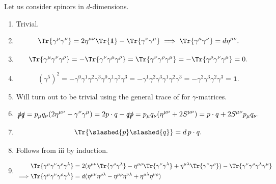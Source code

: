 \begin{solution}
Let us consider spinors in $d$-dimensions.
    \begin{enumerate}[label=\roman*.]
    \item Trivial.
    \item 
    \begin{equation}
            \Tr{\gamma^\mu\gamma^\nu} = 2\eta^{\mu\nu}\Tr{\mathbf{1}} -\Tr{\gamma^\nu\gamma^\mu}\implies\Tr{\gamma^\mu\gamma^\nu} = d\eta^{\mu\nu}.
        \end{equation}
    \item 
    \begin{equation}
        \Tr{\gamma^\mu\gamma^\nu\gamma^\rho} = -\Tr{\gamma^\nu\gamma^\mu\gamma^\rho} =\Tr{\gamma^\nu\gamma^\rho\gamma^\mu} = -\Tr{\gamma^\rho\gamma^\nu\gamma^\mu} =0.
    \end{equation}
    \item 
    \begin{equation}
        (\gamma^5)^2 = -\gamma^0\gamma^1\gamma^2\gamma^3\gamma^0\gamma^1\gamma^2\gamma^3=-\gamma^1\gamma^2\gamma^3\gamma^1\gamma^2\gamma^3 =-\gamma^2\gamma^3\gamma^2\gamma^3 =\mathbf{1}.
    \end{equation}
    \item Will turn out to be trivial using the general trace of for $\gamma$-matrices.
    \item 
    \begin{equation}
        \slashed{p}\slashed{q} = p_\mu q_\nu(2\eta^{\mu\nu}-\gamma^\nu\gamma^\mu) = 2p\cdot q - \slashed{q}\slashed{p} = p_\mu q_\nu(\eta^{\mu\nu}+2S^{\mu\nu}) = p\cdot q + 2S^{\mu\nu}p_\mu q_\nu.
    \end{equation}
    \item 
    \begin{equation}
        \Tr{\slashed{p}\slashed{q}} = d\,p\cdot q.
    \end{equation}
    \item Follows from iii by induction.
    \item 
    \begin{equation}
        \begin{aligned}
            &\Tr{\gamma^\mu\gamma^\nu\gamma^\rho\gamma^\lambda} = 2(\eta^{\mu\nu}\Tr{\gamma^\rho\gamma^\lambda}-\eta^{\mu\rho}\Tr{\gamma^\nu\gamma^\lambda}+\eta^{\mu\lambda}\Tr{\gamma^\nu\gamma^\rho}) -\Tr{\gamma^\nu\gamma^\rho\gamma^\lambda\gamma^\mu}\\
            \implies& \Tr{\gamma^\mu\gamma^\nu\gamma^\rho\gamma^\lambda} = d(\eta^{\mu\nu}\eta^{\rho\lambda}-\eta^{\mu\rho}\eta^{\nu\lambda}+\eta^{\mu\lambda}\eta^{\nu\rho})\\

\end{aligned}
\end{equation}
\end{enumerate}
\end{solution}
